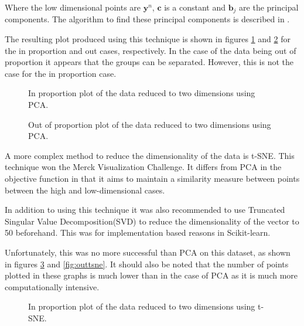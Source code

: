 Where the low dimensional points are $\pmb{y}^{n}$, $\pmb{c}$ is a constant and $\pmb{b}_{j}$ are the principal components.
The algorithm to find these principal components is described in \textcite[333]{barber_bayesian_2013}.

The resulting plot produced using this technique is shown in figures \ref{fig:inpca} and \ref{fig:outpca} for the in proportion and out cases, respectively.
In the case of the data being out of proportion it appears that the groups can be separated.
However, this is not the case for the in proportion case.

\begin{figure}
    \setlength\figureheight{3in}
    \setlength\figurewidth{4in}
    \centering
    \caption{In proportion plot of the data reduced to two dimensions using PCA.}
    \label{fig:inpca}
\end{figure}

\begin{figure}
    \setlength\figureheight{3in}
    \setlength\figurewidth{4in}
    \centering
    \caption{Out of proportion plot of the data reduced to two dimensions using PCA.}
    \label{fig:outpca}
\end{figure}


A more complex method to reduce the dimensionality of the data is t-SNE\autocite{van_der_maaten_visualizing_2008}.
This technique won the Merck Visualization Challenge.
It differs from PCA in the objective function in that it aims to maintain a similarity measure between points between the high and low-dimensional cases.

In addition to using this technique it was also recommended to use Truncated Singular Value Decomposition(SVD) to reduce the dimensionality of the vector to 50 beforehand.
This was for implementation based reasons in Scikit-learn.

Unfortunately, this was no more successful than PCA on this dataset, as shown in figures \ref{fig:intsne} and \ref{fig:outtsne}.
It should also be noted that the number of points plotted in these graphs is much lower than in the case of PCA as it is much more computationally intensive.

\begin{figure}
    \setlength\figureheight{3in}
    \setlength\figurewidth{4in}
    \centering
    \caption{In proportion plot of the data reduced to two dimensions using t-SNE.}
    \label{fig:intsne}
\end{figure}

